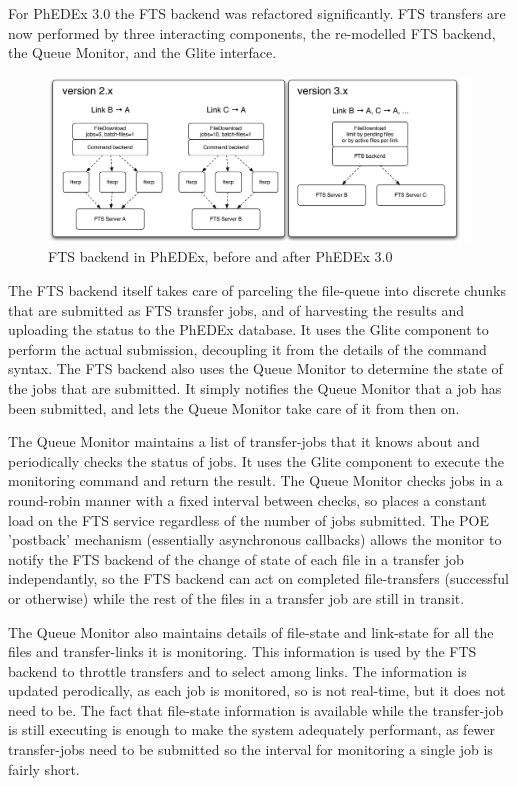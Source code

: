 \documentclass{PoS}
\begin{document}
For PhEDEx 3.0 the FTS backend was refactored significantly. FTS
transfers are now performed by three interacting components, the
re-modelled FTS backend, the Queue Monitor, and the Glite interface.

\begin{figure}[htp] 
\centering
\includegraphics[width=.8\textwidth]{fts-combined.pdf}
\caption{FTS backend in PhEDEx, before and after PhEDEx 3.0}
\label{fig:fts}
\end{figure} 

The FTS backend itself takes care of parceling the file-queue into
discrete chunks that are submitted as FTS transfer jobs, and of
harvesting the results and uploading the status to the PhEDEx
database. It uses the Glite component to perform the actual
submission, decoupling it from the details of the command syntax. The
FTS backend also uses the Queue Monitor to determine the state of the
jobs that are submitted. It simply notifies the Queue Monitor that a
job has been submitted, and lets the Queue Monitor take care of it
from then on.

The Queue Monitor maintains a list of transfer-jobs that it knows
about and periodically checks the status of jobs. It uses the Glite
component to execute the monitoring command and return the result. The
Queue Monitor checks jobs in a round-robin manner with a fixed
interval between checks, so places a constant load on the FTS service
regardless of the number of jobs submitted. The POE 'postback'
mechanism (essentially asynchronous callbacks) allows the monitor to
notify the FTS backend of the change of state of each file in a
transfer job independantly, so the FTS backend can act on completed
file-transfers (successful or otherwise) while the rest of the files
in a transfer job are still in transit.

The Queue Monitor also maintains details of file-state and link-state
for all the files and transfer-links it is monitoring. This
information is used by the FTS backend to throttle transfers and to
select among links. The information is updated perodically, as each
job is monitored, so is not real-time, but it does not need to be. The
fact that file-state information is available while the transfer-job
is still executing is enough to make the system adequately performant,
as fewer transfer-jobs need to be submitted so the interval for
monitoring a single job is fairly short.
\end{document}
